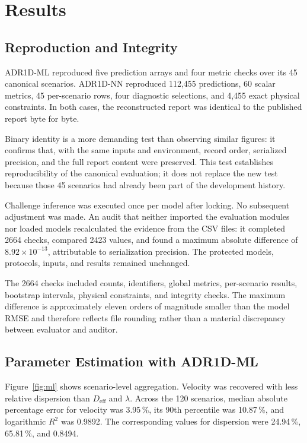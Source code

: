 \documentclass[11pt,a4paper]{article}
\begin{document}
\section{Results}

\subsection{Reproduction and Integrity}

ADR1D-ML reproduced five prediction arrays and four metric checks over its 45
canonical scenarios. ADR1D-NN reproduced 112,455 predictions, 60 scalar
metrics, 45 per-scenario rows, four diagnostic selections, and 4,455 exact
physical constraints. In both cases, the reconstructed report was identical
to the published report byte for byte.

Binary identity is a more demanding test than observing similar figures: it
confirms that, with the same inputs and environment, record order, serialized
precision, and the full report content were preserved. This test establishes
reproducibility of the canonical evaluation; it does not replace the new test
because those 45 scenarios had already been part of the development history.

Challenge inference was executed once per model after locking. No subsequent
adjustment was made. An audit that neither imported the evaluation modules nor
loaded models recalculated the evidence from the CSV files: it completed 2664
checks, compared 2423 values, and found a maximum absolute difference of
$8.92\times10^{-13}$, attributable to serialization precision. The protected
models, protocols, inputs, and results remained unchanged.

The 2664 checks included counts, identifiers, global metrics, per-scenario
results, bootstrap intervals, physical constraints, and integrity checks. The
maximum difference is approximately eleven orders of magnitude smaller than
the model RMSE and therefore reflects file rounding rather than a material
discrepancy between evaluator and auditor.

\subsection{Parameter Estimation with ADR1D-ML}

Figure~\ref{fig:ml} shows scenario-level aggregation. Velocity was recovered
with less relative dispersion than $D_{\mathrm{eff}}$ and $\lambda$. Across
the 120 scenarios, median absolute percentage error for velocity was
3.95\,\%, its 90th percentile was 10.87\,\%, and logarithmic $R^2$ was 0.9892.
The corresponding values for dispersion were 24.94\,\%, 65.81\,\%, and
0.8494.
\end{document}
